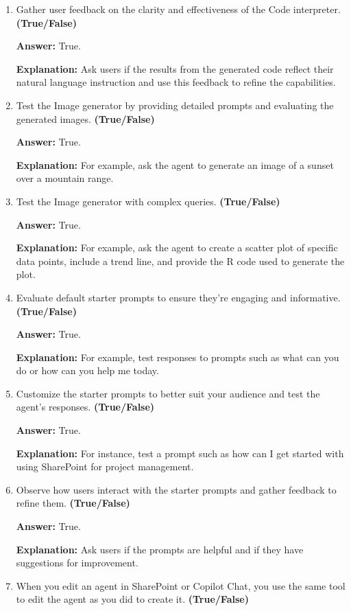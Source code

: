 \documentclass[10pt]{article}
\begin{document}
\begin{enumerate}[leftmargin=*]
\item Gather user feedback on the clarity and effectiveness of the Code interpreter. \textbf{(True/False)}

\textbf{Answer:} True.

\textbf{Explanation:} Ask users if the results from the generated code reflect their natural language instruction and use this feedback to refine the capabilities.

\item Test the Image generator by providing detailed prompts and evaluating the generated images. \textbf{(True/False)}

\textbf{Answer:} True.

\textbf{Explanation:} For example, ask the agent to generate an image of a sunset over a mountain range.

\item Test the Image generator with complex queries. \textbf{(True/False)}

\textbf{Answer:} True.

\textbf{Explanation:} For example, ask the agent to create a scatter plot of specific data points, include a trend line, and provide the R code used to generate the plot.

\item Evaluate default starter prompts to ensure they're engaging and informative. \textbf{(True/False)}

\textbf{Answer:} True.

\textbf{Explanation:} For example, test responses to prompts such as what can you do or how can you help me today.

\item Customize the starter prompts to better suit your audience and test the agent's responses. \textbf{(True/False)}

\textbf{Answer:} True.

\textbf{Explanation:} For instance, test a prompt such as how can I get started with using SharePoint for project management.

\item Observe how users interact with the starter prompts and gather feedback to refine them. \textbf{(True/False)}

\textbf{Answer:} True.

\textbf{Explanation:} Ask users if the prompts are helpful and if they have suggestions for improvement.

\item When you edit an agent in SharePoint or Copilot Chat, you use the same tool to edit the agent as you did to create it. \textbf{(True/False)}


\end{enumerate}
\end{document}
